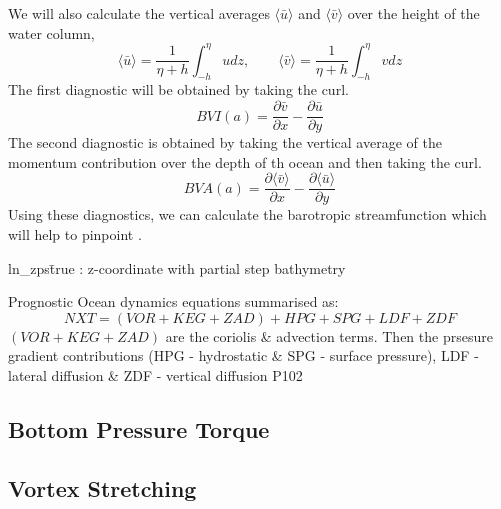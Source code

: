 \documentclass[..\EOYR.tex]{subfiles}
\begin{document}
We will also calculate the vertical averages $\langle\bar{u}\rangle$ and $\langle\bar{v}\rangle$ over the height of the water column, 
\begin{equation}
	\langle\bar{u}\rangle = \frac{1}{\eta + h}\int_{-h}^{\eta}u dz ,\qquad \langle\bar{v}\rangle = \frac{1}{\eta + h}\int_{-h}^{\eta}v dz
\end{equation}
The first diagnostic will be obtained by taking  the curl.
\begin{equation}
	BVI(a) = \frac{\partial \bar{v}}{\partial x} - \frac{\partial \bar{u}}{\partial y}
\end{equation}
The second diagnostic is obtained by taking the vertical average of the momentum contribution over the depth  of th ocean and then taking  the curl. 
\begin{equation}
	BVA(a) = \frac{\partial \langle\bar{v}\rangle}{\partial x} - \frac{\partial \langle\bar{u}\rangle}{\partial y}
\end{equation}
	Using these diagnostics, we can calculate the barotropic  streamfunction which will help to pinpoint .

ln\_zps\=true : z-coordinate with partial step bathymetry


Prognostic Ocean dynamics equations summarised as:
\begin{equation}
    NXT = (VOR+KEG+ZAD)+HPG+SPG+LDF+ZDF
\end{equation}
    $(VOR+KEG+ZAD)$ are the coriolis \& advection terms. Then the prsesure gradient contributions (HPG - hydrostatic \& SPG - surface pressure), LDF - lateral diffusion \& ZDF - vertical diffusion
\citep{Madec2011} P102

\subsection{Bottom Pressure Torque}
\subsection{Vortex Stretching}
\end{document}

